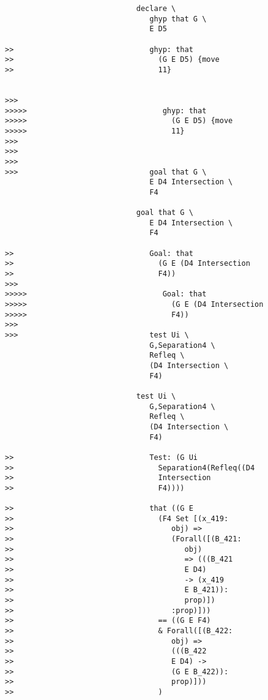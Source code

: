 \documentclass[12pt]{article}
\begin{document}
\begin{verbatim}
                              declare \
                                 ghyp that G \
                                 E D5

>>                               ghyp: that
>>                                 (G E D5) {move
>>                                 11}


>>>
>>>>>                               ghyp: that
>>>>>                                 (G E D5) {move
>>>>>                                 11}
>>>
>>>
>>>
>>>                              goal that G \
                                 E D4 Intersection \
                                 F4

                              goal that G \
                                 E D4 Intersection \
                                 F4

>>                               Goal: that
>>                                 (G E (D4 Intersection
>>                                 F4))
>>>
>>>>>                               Goal: that
>>>>>                                 (G E (D4 Intersection
>>>>>                                 F4))
>>>
>>>                              test Ui \
                                 G,Separation4 \
                                 Refleq \
                                 (D4 Intersection \
                                 F4)

                              test Ui \
                                 G,Separation4 \
                                 Refleq \
                                 (D4 Intersection \
                                 F4)

>>                               Test: (G Ui
>>                                 Separation4(Refleq((D4
>>                                 Intersection
>>                                 F4))))

>>                               that ((G E
>>                                 (F4 Set [(x_419:
>>                                    obj) =>
>>                                    (Forall([(B_421:
>>                                       obj)
>>                                       => (((B_421
>>                                       E D4)
>>                                       -> (x_419
>>                                       E B_421)):
>>                                       prop)])
>>                                    :prop)]))
>>                                 == ((G E F4)
>>                                 & Forall([(B_422:
>>                                    obj) =>
>>                                    (((B_422
>>                                    E D4) ->
>>                                    (G E B_422)):
>>                                    prop)]))
>>                                 )



\end{verbatim}
\end{document}
